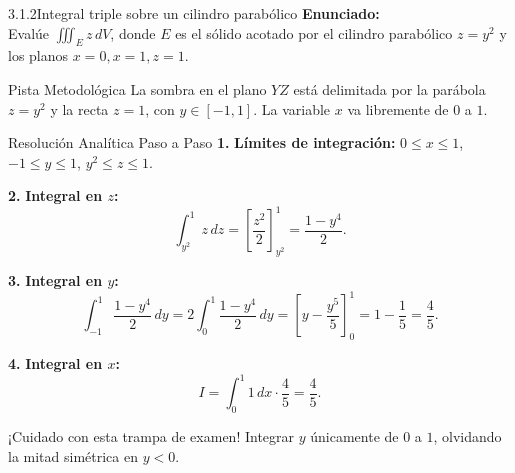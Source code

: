 \documentclass[11pt,a4paper]{article}
\begin{document}
\begin{nivelbox}{3.1.2}{Integral triple sobre un cilindro parabólico}
\textbf{Enunciado:}\\
Evalúe $\iiint_E z \, dV$, donde $E$ es el sólido acotado por el cilindro parabólico $z = y^2$ y los planos $x = 0, x = 1, z = 1$.

\begin{observacionbox}{Pista Metodológica}
La sombra en el plano $YZ$ está delimitada por la parábola $z = y^2$ y la recta $z = 1$, con $y \in [-1, 1]$. La variable $x$ va libremente de $0$ a $1$.
\end{observacionbox}

\begin{ejerciciobox}{Resolución Analítica Paso a Paso}
\smallskip\noindent\textbf{1.} \textbf{Límites de integración:}
$0 \le x \le 1$, $-1 \le y \le 1$, $y^2 \le z \le 1$.

\smallskip\noindent\textbf{2.} \textbf{Integral en $z$:}
\[\int_{y^2}^1 z \, dz = \left[ \frac{z^2}{2} \right]_{y^2}^1 = \frac{1 - y^4}{2}.\]

\smallskip\noindent\textbf{3.} \textbf{Integral en $y$:}
\[\int_{-1}^1 \frac{1 - y^4}{2} \, dy = 2 \int_0^1 \frac{1 - y^4}{2} \, dy = \left[ y - \frac{y^5}{5} \right]_0^1 = 1 - \frac{1}{5} = \frac{4}{5}.\]

\smallskip\noindent\textbf{4.} \textbf{Integral en $x$:}
\[I = \int_0^1 1 \, dx \cdot \frac{4}{5} = \frac{4}{5}.\]
\end{ejerciciobox}

\begin{errorbox}{¡Cuidado con esta trampa de examen!}
Integrar $y$ únicamente de $0$ a $1$, olvidando la mitad simétrica en $y < 0$.
\end{errorbox}
\end{nivelbox}
\bigskip
\end{document}
